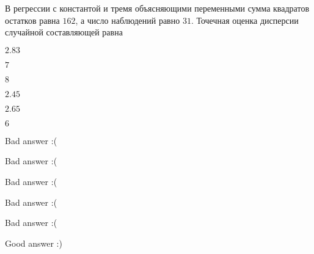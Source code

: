 
\begin{question}
В регрессии с константой и тремя объясняющими переменными
сумма квадратов остатков равна \(162\),
а число наблюдений равно \(31\).
Точечная оценка дисперсии случайной составляющей равна
\begin{answerlist}
  \item \(2.83\)
  \item \(7\)
  \item \(8\)
  \item \(2.45\)
  \item \(2.65\)
  \item \(6\)
\end{answerlist}
\end{question}

\begin{solution}
\begin{answerlist}
  \item Bad answer :(
  \item Bad answer :(
  \item Bad answer :(
  \item Bad answer :(
  \item Bad answer :(
  \item Good answer :)
\end{answerlist}
\end{solution}

